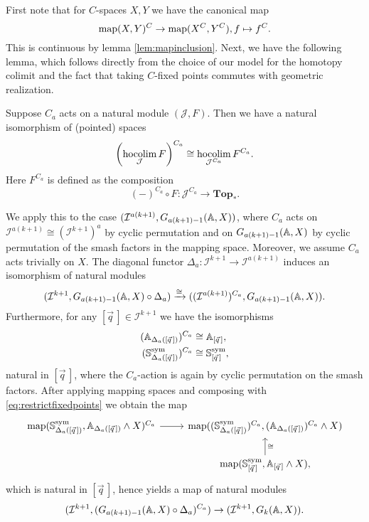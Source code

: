 First note that for $C$-spaces $X,Y$ we have the canonical map
\begin{equation}\label{eq:restrictfixedpoints}
\mathrm{map}(X,Y)^C\to \mathrm{map}(X^C, Y^C), f\mapsto f^C.
\end{equation}
This is continuous by lemma \ref{lem:mapinclusion}.
Next, we have the following lemma, which follows directly from the choice of our
model for the homotopy colimit and the fact that taking $C$-fixed points
commutes with geometric realization.
\begin{lem}\label{lem:hocolimfixedpoints}
Suppose $C_a$ acts on a natural module $(\mathcal{J}, F)$. Then we have
a natural isomorphism of (pointed) spaces
\[
\left(\underset{\mathcal{J}}{\mathrm{hocolim}}\, F\right)^{C_a}\cong \underset{\mathcal{J}^{C_a}}{\mathrm{hocolim}}\,  F^{C_a}.
\]
Here  $F^{C_a}$ is defined as the composition  \[
(-)^{C_a}\circ F: \mathcal{J}^{C_a}\to \mathbf{Top}_\ast.
\]
\end{lem}
We apply this to the case $(\mathcal{I}^{a(k+1)}, G_{a(k+1) - 1}(\mathbb{A}, X))$, where $C_a$ acts on $\mathcal{I}^{a(k+1)}\cong (\mathcal{I}^{k+1})^a$
by cyclic permutation and on $G_{a(k+1) - 1}(\mathbb{A}, X)$ by cyclic permutation of the smash factors in the mapping space.
Moreover, we assume $C_a$ acts trivially on $X$.
The diagonal functor $\Delta_a:\mathcal{I}^{k+1} \to \mathcal{I}^{a(k+1)}$ induces an isomorphism of natural
modules 
\[
(\mathcal{I}^{k+1},  G_{a(k+1) - 1}(\mathbb{A}, X)\circ \Delta_a)\xrightarrow{\cong}
((\mathcal{I}^{a(k+1)})^{C_a}, G_{a(k+1) - 1}(\mathbb{A}, X)).
\]
Furthermore, for any $[\vec{q}\,]\in \mathcal{I}^{k+1}$ we have the isomorphisms
\begin{align}
\begin{split}
(\mathbb{A}_{\Delta_a([\vec{q}\,])})^{C_a}&\cong \mathbb{A}_{[\vec{q}\,]}, \\
(\mathbb{S}^{\mathrm{sym}}_{\Delta_a([\vec{q}\,])})^{C_a}
&\cong  \mathbb{S}^{\mathrm{sym}}_{[\vec{q}\,]},
\end{split}
\end{align}
natural in $[\vec{q}\,]$, where the $C_a$-action is again by cyclic permutation on the smash factors.
After applying mapping spaces and composing with \eqref{eq:restrictfixedpoints}
we obtain the map
\begin{equation}\label{eq:prerestriction}
\begin{tikzcd}
 \map(\mathbb{S}^{\mathrm{sym}}_{\Delta_a([\vec{q}\,])}, \A_{\Delta_a([\vec{q}\,])}\wedge X)^{C_a}
\arrow{r} 
&\map((\mathbb{S}^{\mathrm{sym}}_{\Delta_a([\vec{q}\,])})^{C_a},
(\A_{\Delta_a([\vec{q}\,])})^{C_a}\wedge X)\\
&\map(\mathbb{S}^{\mathrm{sym}}_{[\vec{q}\,]},  \A_{[\vec{q}\,]} \wedge X),
\arrow[swap]{u}{\cong}
\end{tikzcd}
\end{equation}
which is natural in $[\vec{q}\,]$, hence yields a map of natural modules 
\begin{equation}
(\mathcal{I}^{k+1},  ( G_{a(k+1) - 1}(\mathbb{A}, X)\circ \Delta_a)^{C_a})\to
(\mathcal{I}^{k+1},  G_{k}(\mathbb{A}, X)).
\end{equation}

